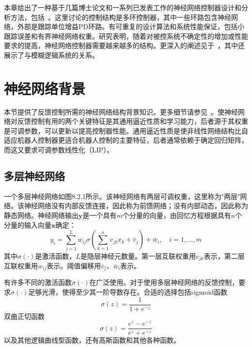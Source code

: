 \documentclass[12pt,a4paper]{ctexart}
\begin{document}
本章给出了一种基于几篇博士论文和一系列已发表工作的神经网络控制器设计和分析方法，包括~\cite{lewis1999,kim1998}。这里讨论的控制结构是多环控制器，其中一些环路包含神经网络，外部是跟踪单位增益PD环路。有可重复的设计算法和系统性能保证，包括小跟踪误差和有界神经网络权重。研究表明，随着对被控系统不确定性的增加或性能要求的提高，神经网络控制器需要越来越多的结构。更深入的阐述见于~\cite{lewis1999}，其中还展示了与模糊逻辑系统的关系。

\section{神经网络背景}

本节提供了反馈控制所需的神经网络结构背景知识。更多细节请参见~\cite{haykin1994,lewis1999,lewis1998b}。使神经网络对反馈控制有用的两个关键特征是其通用逼近性质和学习能力，后者源于其权重是可调参数，可以更新以提高控制器性能。通用逼近性质是使非线性网络结构比自适应机器人控制器更适合机器人控制的主要特征，后者通常依赖于确定回归矩阵，而这又要求可调参数线性化（LIP）。

\subsection{多层神经网络}

一个多层神经网络如图8.2.1所示。该神经网络有两层可调权重，这里称为"两层"网络。该神经网络没有内部反馈连接，因此称为前馈网络；没有内部动态，因此称为静态网络。神经网络输出$\bm{y}$是一个具有$m$个分量的向量，由回忆方程根据具有$n$个分量的输入向量$\bm{x}$确定：
\begin{equation}\label{eq:8.2.1}
y_i = \sum_{j=1}^{L} w_{ij} \sigma\left(\sum_{k=1}^{n} v_{jk} x_k + \bar{v}_j\right) + \bar{w}_i, \quad i = 1, \ldots, m
\end{equation}
其中$\sigma(\cdot)$是激活函数，$L$是隐层神经元数量。第一层互联权重用$v_{jk}$表示，第二层互联权重用$w_{ij}$表示。阈值偏移用$\bar{v}_j$、$\bar{w}_i$表示。

有许多不同的激活函数$\sigma(\cdot)$在广泛使用。对于使用多层神经网络的反馈控制，要求$\sigma(\cdot)$足够光滑，使得至少其一阶导数存在。合适的选择包括sigmoid函数
\begin{equation}\label{eq:8.2.2}
\sigma(z) = \frac{1}{1 + e^{-z}}
\end{equation}
双曲正切函数
\begin{equation}\label{eq:8.2.3}
\sigma(z) = \frac{e^z - e^{-z}}{e^z + e^{-z}}
\end{equation}
以及其他逻辑曲线型函数，还有高斯函数和其他各种函数。
\end{document}
